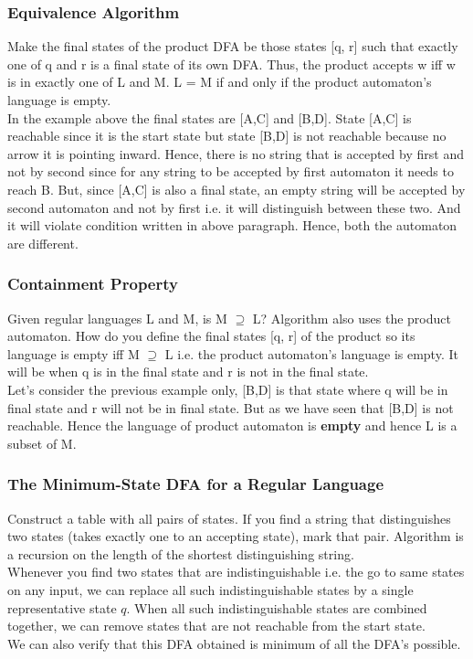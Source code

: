\documentclass{report}
\begin{document}
\subsubsection{Equivalence Algorithm}
Make the final states of the product DFA be those states [q, r] such that exactly one of q and r is a final state of its own DFA. Thus, the product accepts w iff w is in
exactly one of L and M. L = M if and only if the product automaton’s language is empty.
\\
In the example above the final states are [A,C] and [B,D]. State [A,C] is reachable since it is the start state but state [B,D] is not reachable because no arrow it is pointing inward. Hence, there is no string that is accepted by first and not by second since for any string to be accepted by first automaton it needs to reach B. But, since [A,C] is also a final state, an empty string will be accepted by second automaton and not by first i.e. it will distinguish between these two. And it will violate condition written in above paragraph. Hence, both the automaton are different. 

\subsubsection{Containment Property}
Given regular languages L and M, is M $\supseteq$ L? Algorithm also uses the product
automaton. How do you define the final states [q, r] of the product so its language is empty iff M $\supseteq$ L i.e. the product automaton’s language is empty. It will be when q is in the final state and r is not in the final state.
\\
Let's consider the previous example only, [B,D] is that state where q will be in final state and r will not be in final state. But as we have seen that [B,D] is not reachable. Hence the language of product automaton is \textbf{empty} and hence L is a subset of M. 

\subsubsection{The Minimum-State DFA for a Regular Language}
Construct a table with all pairs of states. If you find a string that distinguishes
two states (takes exactly one to an accepting state), mark that pair. Algorithm is a recursion on the length of the shortest distinguishing string. 
\\
Whenever you find two states that are indistinguishable i.e. the go to same states on any input, we can replace all such indistinguishable states by a single representative state $q$. When all such indistinguishable states are combined together, we can remove states that are not reachable from the start state.
\\
We can also verify that this DFA obtained is minimum of all the DFA's possible. 
\end{document}

